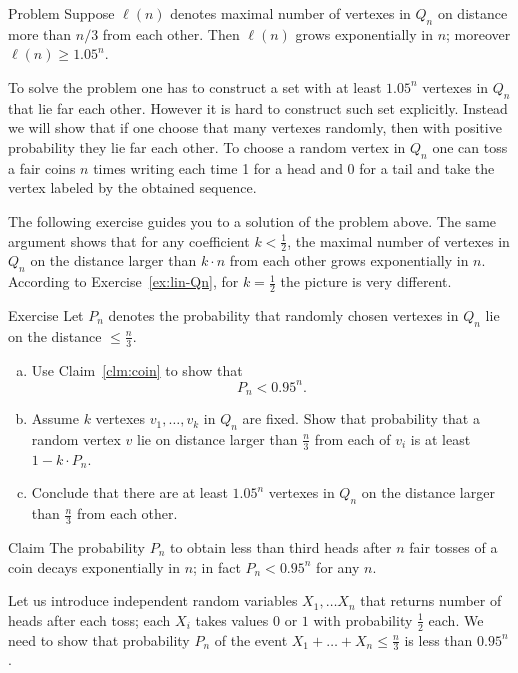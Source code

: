 \begin{thm}{Problem}\label{prob:Qn}
Suppose $\ell(n)$ denotes maximal number of vertexes in $Q_n$ on distance more than $n/3$ from each other.
Then $\ell(n)$ grows exponentially in $n$;
moreover $\ell(n)\ge 1.05^n$. 
\end{thm}

To solve the problem one has to construct a set with at least $1.05^n$ vertexes in $Q_n$ that lie far each other.
However it is hard to construct such set explicitly.
Instead we will show that if one choose that many vertexes randomly, then with positive probability they lie far each other.
To choose a random vertex in $Q_n$ one can toss a fair coins $n$ times writing each time 1 for a head and 0 for a tail and take the vertex labeled by the obtained sequence.

The following exercise guides you to a solution of the problem above.
The same argument shows that for any coefficient $k<\tfrac12$, the maximal number of vertexes in $Q_n$ on the distance larger than $k\cdot n$ from each other grows exponentially in $n$.
According to Exercise~\ref{ex:lin-Qn}, for $k= \tfrac12$ the picture is very different.

\begin{thm}{Exercise}
Let $P_n$ denotes the probability that randomly chosen vertexes in $Q_n$ lie on the distance $\le\tfrac n3$.
\begin{enumerate}[(a)]
\item Use Claim~\ref{clm:coin} to show that 
\[P_n<0.95^n.\]

\item Assume $k$ vertexes  $v_1,\dots ,v_k$ in $Q_n$ are fixed. 
Show that probability that a random vertex $v$ lie on distance larger than $\tfrac n3$ from each of $v_i$ is at least $1-k\cdot P_n$.


\item Conclude that there are at least $1.05^n$ vertexes in $Q_n$ on the distance larger than $\tfrac n3$ from each other.
\end{enumerate}
\end{thm}


\begin{thm}{Claim}\label{clm:coin}
The probability $P_n$ to obtain less than third heads after $n$ fair tosses of a coin decays exponentially in $n$;
in fact $P_n<0.95^n$ for any $n$.
\end{thm}

Let us introduce independent random variables $X_1,\dots X_n$ that returns number of heads after each toss;
each $X_i$ takes values $0$ or $1$ with probability $\tfrac12$ each.
We need to show that probability $P_n$ of the event $X_1+\dots+X_n\le\tfrac n3$ is less than 
$0.95^n$.

